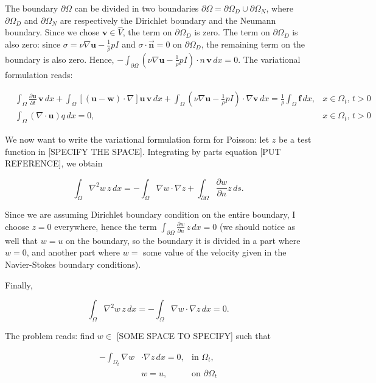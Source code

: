 \documentclass[11pt,a4paper,titlepage]{report}
\begin{document}
The boundary $\partial \Omega$ can be divided in two boundaries $ \partial \Omega = \partial \Omega_D \cup \partial \Omega_N $, where $\partial \Omega_D$ and $\partial \Omega_N$ are respectively the Dirichlet boundary and the Neumann boundary. 
Since we chose $\mathbf{v} \in \hat{V}$, the term on $\partial \Omega_{D}$ is zero. The term on $\partial \Omega_{D}$ is also zero: since $\sigma = \nu \nabla \mathbf{u} -  \frac{1}{\rho} pI$ and $\sigma \cdot \vec{\mathbf{n}} = 0$ on $\partial \Omega_{D}$, the remaining term on the boundary is also zero. Hence, $- \int_{\partial \Omega} (\nu \nabla \mathbf{u} -  \frac{1}{\rho}  pI) \cdot n \, \mathbf{v} \, dx = 0$. The variational formulation reads:

\[
\begin{aligned}
& \int_{\Omega} \frac{\partial \mathbf{u}}{\partial t} \, \mathbf{v} \, dx 
+ \int_{\Omega} [(\mathbf{u - w}) \cdot \nabla] \mathbf{u} \, \mathbf{v} \, dx
+ \int_{\Omega} (\nu \nabla \mathbf{u} -  \frac{1}{\rho}  pI) \cdot \nabla \mathbf{v} \, dx
=  \frac{1}{\rho} \int_{\Omega} \mathbf{f} \, dx,  & x \in \Omega_t, \, t>0 \\
& \int_{\Omega} ( \nabla \cdot \mathbf{u} ) q \, dx = 0 , & x \in \Omega_t, \, t>0
\end{aligned}
\]

We now want to write the variational formulation form for Poisson: let $z$ be a test function in [SPECIFY THE SPACE]. Integrating by parts equation [PUT REFERENCE], we obtain

\[
\int_{\Omega} \nabla^2 w \, z \, dx = - \int_{\Omega} \nabla w \cdot \nabla z + \int_{\partial \Omega} \frac{\partial w}{\partial n} z \, ds.
\]

Since we are assuming Dirichlet boundary condition on the entire boundary, I choose $z = 0$ everywhere, hence the term $\int_{\partial \Omega} \frac{\partial w}{\partial n} \, z \, dx  = 0 $ (we should notice as well that $w = u$ on the boundary, so the boundary it is divided in a part where $w = 0$, and another part where $w = $ some value of the velocity given in the Navier-Stokes boundary conditions). 

Finally,

\[
\int_{\Omega} \nabla^2 w \, z \, dx = - \int_{\Omega} \nabla w \cdot \nabla z \, dx = 0.
\]

The problem reads: find $w \in$ [SOME SPACE TO SPECIFY] such that

\[
\begin{aligned}
-  \int_{\Omega_t} \nabla w & \cdot \nabla z \, dx = 0, & \text{in } \Omega_t, \\
& w = u, & \text{on } \partial \Omega_t
\end{aligned}
\]
\end{document}
